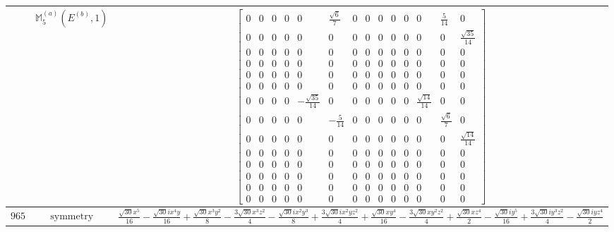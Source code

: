 \documentclass[fleqn,8pt,landscape]{jsarticle}
\begin{document}
\begin{longtable}{ccc}
$  $ & $ \mathbb{M}_{5}^{(a)}(E^{(b)},1) $ & $ \begin{bmatrix} 0 & 0 & 0 & 0 & 0 & \frac{\sqrt{6}}{7} & 0 & 0 & 0 & 0 & 0 & 0 & \frac{5}{14} & 0 \\ 0 & 0 & 0 & 0 & 0 & 0 & 0 & 0 & 0 & 0 & 0 & 0 & 0 & \frac{\sqrt{35}}{14} \\ 0 & 0 & 0 & 0 & 0 & 0 & 0 & 0 & 0 & 0 & 0 & 0 & 0 & 0 \\ 0 & 0 & 0 & 0 & 0 & 0 & 0 & 0 & 0 & 0 & 0 & 0 & 0 & 0 \\ 0 & 0 & 0 & 0 & 0 & 0 & 0 & 0 & 0 & 0 & 0 & 0 & 0 & 0 \\ 0 & 0 & 0 & 0 & 0 & 0 & 0 & 0 & 0 & 0 & 0 & 0 & 0 & 0 \\ 0 & 0 & 0 & 0 & - \frac{\sqrt{35}}{14} & 0 & 0 & 0 & 0 & 0 & 0 & \frac{\sqrt{14}}{14} & 0 & 0 \\ 0 & 0 & 0 & 0 & 0 & - \frac{5}{14} & 0 & 0 & 0 & 0 & 0 & 0 & \frac{\sqrt{6}}{7} & 0 \\ 0 & 0 & 0 & 0 & 0 & 0 & 0 & 0 & 0 & 0 & 0 & 0 & 0 & \frac{\sqrt{14}}{14} \\ 0 & 0 & 0 & 0 & 0 & 0 & 0 & 0 & 0 & 0 & 0 & 0 & 0 & 0 \\ 0 & 0 & 0 & 0 & 0 & 0 & 0 & 0 & 0 & 0 & 0 & 0 & 0 & 0 \\ 0 & 0 & 0 & 0 & 0 & 0 & 0 & 0 & 0 & 0 & 0 & 0 & 0 & 0 \\ 0 & 0 & 0 & 0 & 0 & 0 & 0 & 0 & 0 & 0 & 0 & 0 & 0 & 0 \\ 0 & 0 & 0 & 0 & 0 & 0 & 0 & 0 & 0 & 0 & 0 & 0 & 0 & 0 \end{bmatrix} $ \\ \hline
$ 965 $ & $ \text{symmetry} $ & $ \frac{\sqrt{30} x^{5}}{16} - \frac{\sqrt{30} i x^{4} y}{16} + \frac{\sqrt{30} x^{3} y^{2}}{8} - \frac{3 \sqrt{30} x^{3} z^{2}}{4} - \frac{\sqrt{30} i x^{2} y^{3}}{8} + \frac{3 \sqrt{30} i x^{2} y z^{2}}{4} + \frac{\sqrt{30} x y^{4}}{16} - \frac{3 \sqrt{30} x y^{2} z^{2}}{4} + \frac{\sqrt{30} x z^{4}}{2} - \frac{\sqrt{30} i y^{5}}{16} + \frac{3 \sqrt{30} i y^{3} z^{2}}{4} - \frac{\sqrt{30} i y z^{4}}{2} $ \\

\end{longtable}
\end{document}
